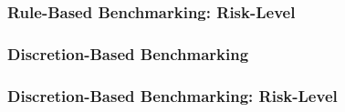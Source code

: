 \documentclass{beamer}
\begin{document}
\begin{frame}
  \frametitle{Rule-Based Benchmarking: Risk-Level}
\end{frame}


\begin{frame}
  \frametitle{Discretion-Based Benchmarking}
\end{frame}


\begin{frame}
  \frametitle{Discretion-Based Benchmarking: Risk-Level}
\end{frame}
\end{document}
